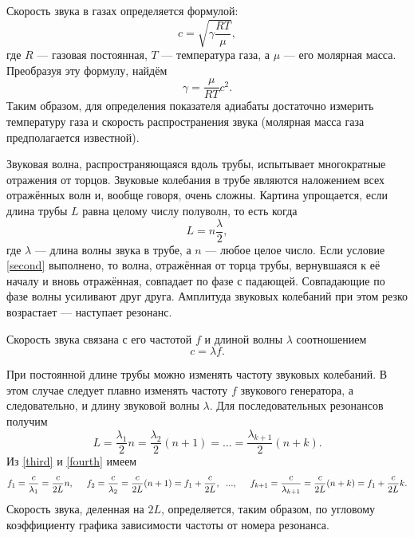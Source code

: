 \documentclass[a4paper, 12pt]{article}
\begin{document}
    Скорость звука в газах определяется формулой:
    \begin{equation}
        c=\sqrt{\gamma\frac{RT}{\mu}},
    \end{equation}
    \noindent где $ R $ — газовая постоянная, $ T $ — температура газа, а $ \mu $ — его молярная масса. Преобразуя эту формулу, найдём
    \begin{equation}
        \gamma=\frac{\mu}{RT}c^{2}.
        \label{first}
    \end{equation}
    \noindent Таким образом, для определения показателя адиабаты достаточно измерить температуру газа и скорость распространения звука (молярная масса газа предполагается известной).
    
    Звуковая волна, распространяющаяся вдоль трубы, испытывает многократные отражения от торцов. Звуковые колебания в трубе являются наложением всех отражённых волн и, вообще говоря, очень сложны. Картина упрощается, если длина трубы $ L $ равна целому числу полуволн, то есть когда
    \begin{equation}
        L=n\frac{\lambda}{2},
        \label{second}
    \end{equation}
    \noindent где $ \lambda $ — длина волны звука в трубе, а $ n $ — любое целое число. Если условие \eqref{second} выполнено, то волна, отражённая от торца трубы, вернувшаяся к её началу и вновь отражённая, совпадает по фазе с падающей. Совпадающие по фазе волны усиливают друг друга. Амплитуда звуковых колебаний при этом резко возрастает — наступает резонанс.
    
    Скорость звука связана с его частотой $ f $ и длиной волны $ \lambda $ соотношением
    \begin{equation}
        c=\lambda f.
        \label{third}
    \end{equation}
    
    При постоянной длине трубы можно изменять частоту звуковых колебаний. В этом случае следует плавно изменять частоту $ f $ звукового генератора, а следовательно, и длину звуковой волны $ \lambda $. Для последовательных резонансов получим
    \begin{equation}
        L=\frac{\lambda_{1}}{2}n=\frac{\lambda_{2}}{2}(n+1)=...=\frac{\lambda_{k+1}}{2}(n+k).
        \label{fourth}
    \end{equation}
    Из \eqref{third} и \eqref{fourth} имеем
    \begin{equation}
        f_{1}=\frac{c}{\lambda_{1}}=\frac{c}{2L}n,\hspace{0.5cm}
        f_{2}=\frac{c}{\lambda_{2}}=\frac{c}{2L}(n+1)=f_{1}+\frac{c}{2L},\hspace{0.2cm}
        ...,\hspace{0.5cm}
        f_{k+1}=\frac{c}{\lambda_{k+1}}=\frac{c}{2L}(n+k)=f_{1}+\frac{c}{2L}k.
        \label{fifth}
    \end{equation}
    Скорость звука, деленная на $ 2L $, определяется, таким образом, по угловому коэффициенту графика зависимости частоты от номера резонанса.\\
    
\end{document}
